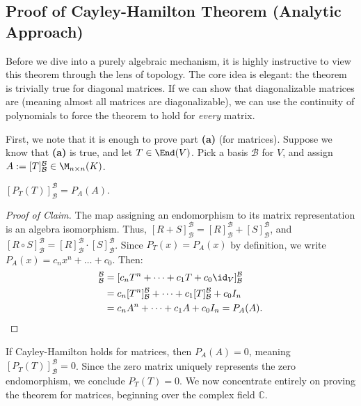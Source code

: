 \subsection*{Proof of Cayley-Hamilton Theorem (Analytic Approach)}

Before we dive into a purely algebraic mechanism, it is highly instructive to view this theorem through the lens of topology. The core idea is elegant: the theorem is trivially true for diagonal matrices. If we can show that diagonalizable matrices are  (meaning almost all matrices are diagonalizable), we can use the continuity of polynomials to force the theorem to hold for \textit{every} matrix.

First, we note that it is enough to prove part \textbf{(a)} (for matrices). Suppose we know that \textbf{(a)} is true, and let $T \in \End(V)$. Pick a basis $\mathcal{B}$ for $V$, and assign $A := [T]_{\mathcal{B}}^{\mathcal{B}} \in \M_{n \times n}(K)$.

\begin{claim*}\label{claim:matrix_poly}
  $[P_T(T)]_{\mathcal{B}}^{\mathcal{B}} = P_A(A)$.
\end{claim*}

\begin{proof}[Proof of Claim]
  The map assigning an endomorphism to its matrix representation is an algebra isomorphism. Thus, $[R+S]_{\mathcal{B}}^{\mathcal{B}} = [R]_{\mathcal{B}}^{\mathcal{B}} + [S]_{\mathcal{B}}^{\mathcal{B}}$, and $[R \circ S]_{\mathcal{B}}^{\mathcal{B}} = [R]_{\mathcal{B}}^{\mathcal{B}} \cdot [S]_{\mathcal{B}}^{\mathcal{B}}$.
  Since $P_T(x) = P_A(x)$ by definition, we write $P_A(x) = c_n x^n + \dots + c_0$. Then:
  \begin{align*}
    [P_T(T)]_{\mathcal{B}}^{\mathcal{B}} &= [c_n T^n + \dots + c_1 T + c_0 \id_V]_{\mathcal{B}}^{\mathcal{B}} \\
    &= c_n [T^n]_{\mathcal{B}}^{\mathcal{B}} + \dots + c_1 [T]_{\mathcal{B}}^{\mathcal{B}} + c_0 I_n \\
    &= c_n A^n + \dots + c_1 A + c_0 I_n = P_A(A).
  \end{align*}
\end{proof}

If Cayley-Hamilton holds for matrices, then $P_A(A) = 0$, meaning $[P_T(T)]_{\mathcal{B}}^{\mathcal{B}} = 0$. Since the zero matrix uniquely represents the zero endomorphism, we conclude $P_T(T) = 0$. We now concentrate entirely on proving the theorem for matrices, beginning over the complex field $\mathbb{C}$.

